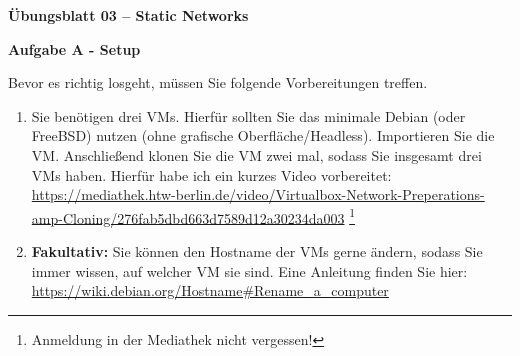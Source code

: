 \documentclass[paper=a4,fontsize=11pt]{scrartcl}%
\begin{document}
\begin{center}
\Large{\textbf{Übungsblatt 03 -- Static Networks}}\\
\end{center}

\begin{center}\Large{\textbf{Aufgabe A - Setup}}\end{center}
Bevor es richtig losgeht, müssen Sie folgende Vorbereitungen treffen.
\begin{enumerate}
	\item Sie benötigen drei VMs. Hierfür sollten Sie das minimale Debian (oder FreeBSD) nutzen (ohne grafische Oberfläche/Headless). Importieren Sie die VM. Anschließend klonen Sie die VM zwei mal, sodass Sie insgesamt drei VMs haben. Hierfür habe ich ein kurzes Video vorbereitet: \url{https://mediathek.htw-berlin.de/video/Virtualbox-Network-Preperations-amp-Cloning/276fab5dbd663d7589d12a30234da003} \footnote{Anmeldung in der Mediathek nicht vergessen!}
	\item \textbf{Fakultativ:} Sie können den Hostname der VMs gerne ändern, sodass Sie immer wissen, auf welcher VM sie sind. Eine Anleitung finden Sie hier: \url{https://wiki.debian.org/Hostname#Rename_a_computer}
\end{enumerate}
	
\end{document}
